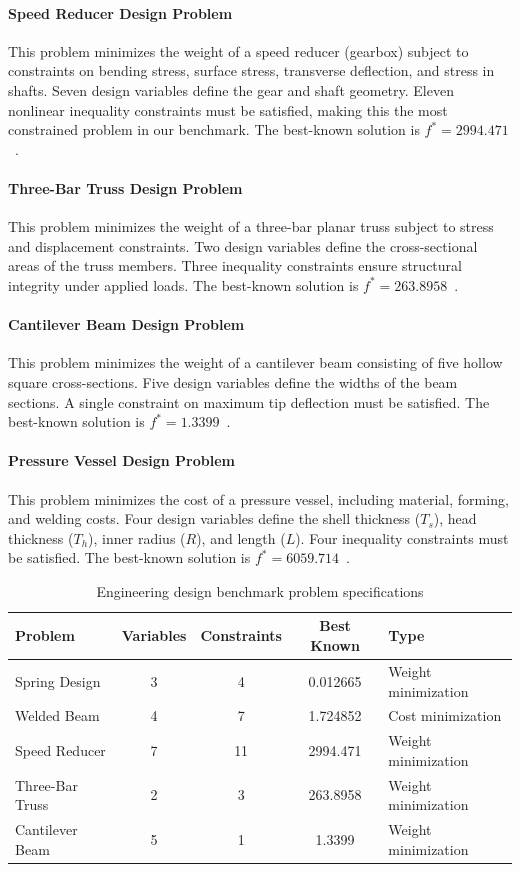 \documentclass[11pt]{article}
\begin{document}
\paragraph{Speed Reducer Design Problem} This problem minimizes the weight of a speed reducer (gearbox) subject to constraints on bending stress, surface stress, transverse deflection, and stress in shafts. Seven design variables define the gear and shaft geometry. Eleven nonlinear inequality constraints must be satisfied, making this the most constrained problem in our benchmark. The best-known solution is $f^* = 2994.471$~\citep{golinski1970optimal}.

\paragraph{Three-Bar Truss Design Problem} This problem minimizes the weight of a three-bar planar truss subject to stress and displacement constraints. Two design variables define the cross-sectional areas of the truss members. Three inequality constraints ensure structural integrity under applied loads. The best-known solution is $f^* = 263.8958$~\citep{ray2001society}.

\paragraph{Cantilever Beam Design Problem} This problem minimizes the weight of a cantilever beam consisting of five hollow square cross-sections. Five design variables define the widths of the beam sections. A single constraint on maximum tip deflection must be satisfied. The best-known solution is $f^* = 1.3399$~\citep{mirjalili2017salp}.

\paragraph{Pressure Vessel Design Problem} This problem minimizes the cost of a pressure vessel, including material, forming, and welding costs. Four design variables define the shell thickness ($T_s$), head thickness ($T_h$), inner radius ($R$), and length ($L$). Four inequality constraints must be satisfied. The best-known solution is $f^* = 6059.714$~\citep{kannan2009method}.

\begin{table}[ht]
\centering
\caption{Engineering design benchmark problem specifications}
\label{tab:engineering_specs}
\small
\begin{tabular}{@{}lcccl@{}}
\toprule
Problem & Variables & Constraints & Best Known & Type \\
\midrule
Spring Design & 3 & 4 & 0.012665 & Weight minimization \\
Welded Beam & 4 & 7 & 1.724852 & Cost minimization \\
Speed Reducer & 7 & 11 & 2994.471 & Weight minimization \\
Three-Bar Truss & 2 & 3 & 263.8958 & Weight minimization \\
Cantilever Beam & 5 & 1 & 1.3399 & Weight minimization \\
\bottomrule
\end{tabular}
\end{table}
\end{document}
